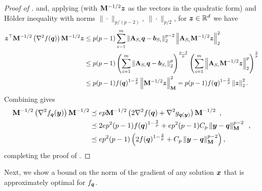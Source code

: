 \begin{proof}[Proof of ]
and, applying  (with $\mathbf{M}^{-1/2}\bm{z}$ as the vectors in the quadratic form) and H\"older inequality with norms $\|\cdot\|_{p/(p-2)},\ \|\cdot\|_{p/2}$, for $\bm{z}\in\mathbb{R}^d$ we have
\begin{align*}
    \bm{z}^{\top}\mathbf{M}^{-1/2}\left(\nabla^2 f(\bm{q})\right) \mathbf{M}^{-1/2}\bm{z} &\le p(p-1)\sum_{i=1}^m \left\lVert \mathbf{A}_{S_i}\bm{q}-\bm{b}_{S_i} \right\rVert_2^{p-2}\left\lVert \mathbf{A}_{S_i}\mathbf{M}^{-1/2}\bm{z} \right\rVert_2^2 \\
    &\le p(p-1)\left(\sum_{i=1}^m \left\lVert \mathbf{A}_{S_i}\bm{q}-\bm{b}_{S_i} \right\rVert_2^p\right)^{\frac{p-2}{p}}\left(\sum_{i=1}^m \left\lVert \mathbf{A}_{S_i}\mathbf{M}^{-1/2}\bm{z} \right\rVert_2^p\right)^{\frac{2}{p}} \\
    &\le p(p-1)f(\bm{q})^{1-\frac{2}{p}}\left\lVert \mathbf{M}^{-1/2}\bm{z} \right\rVert_{\mathbf{M}}^2 = p(p-1)f(\bm{q})^{1-\frac{2}{p}}\left\lVert \bm{z} \right\rVert_2^2.
\end{align*}
Combining gives
\begin{align*}
    \mathbf{M}^{-1/2}\left(\nabla^2f_{\bm{q}}(\bm{y})\right)\mathbf{M}^{-1/2} &\preceq ep\mathbf{M}^{-1/2}\left(2\nabla^2f(\bm{q}) + \nabla^2g_{\bm{q}(\bm{y})}\right)\mathbf{M}^{-1/2}\enspace,\\    
    &\preceq 2ep^2(p-1)f(\bm{q})^{1-\frac{2}{p}} + ep^2(p-1)C_p\left\lVert \bm{y}-\bm{q} \right\rVert_{\mathbf{M}}^{p-2}\enspace, \\
    &\preceq ep^2(p-1)\left(2f(\bm{q})^{1-\frac{2}{p}}+C_p\left\lVert \bm{y}-\bm{q} \right\rVert_{\mathbf{M}}^{p-2}\right),
\end{align*}
completing the proof of .
\end{proof}

Next, we show a bound on the norm of the gradient of any solution $\bm{x}$ that is approximately optimal for $f_{\bm{q}}$.

